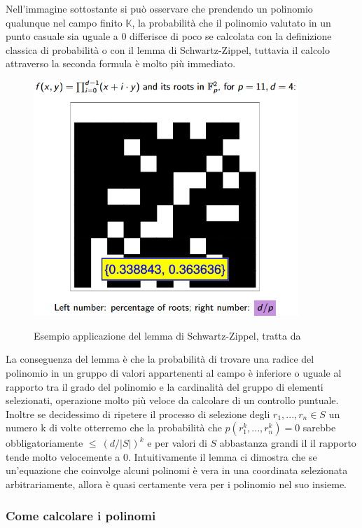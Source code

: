 Nell'immagine sottostante si può osservare che prendendo un polinomio qualunque nel campo finito $\mathbb{K}$, la
probabilità che il polinomio valutato in un punto casuale sia uguale a 0 differisce di poco se calcolata con la
definizione classica di probabilità o con il lemma di Schwartz-Zippel, tuttavia il calcolo attraverso la seconda formula è molto più immediato.
\begin{figure}[H]
    \centering
    \includegraphics[width=10cm]{./chapters/1.state-of-art/images/7.schwartz_zippel_lemma.png}
    \label{fig:schwartz-zippel-lemma}
    \captionsetup{justification=centering}
    \caption{Esempio applicazione del lemma di Schwartz-Zippel, tratta da \cite{23-schwartz-zippel}}
\end{figure}
\clearpage

La conseguenza del lemma è che la probabilità di trovare una radice del polinomio in un gruppo di valori appartenenti al
campo è inferiore o uguale al rapporto tra il grado del polinomio e la cardinalità del gruppo di elementi selezionati,
operazione molto più veloce da calcolare di un controllo puntuale. Inoltre se decidessimo di ripetere il processo di
selezione degli $r_1,...,r_n \in S$ un numero k di volte otterremo che la probabilità che $p(r^k_1,...,r^k_n) = 0$
sarebbe obbligatoriamente $\le \ (d/|S|)^k$  e per valori di $S$ abbastanza grandi il il rapporto tende molto velocemente
a 0. Intuitivamente il lemma ci dimostra che se un'equazione che coinvolge alcuni polinomi è vera in una coordinata
selezionata arbitrariamente, allora è quasi certamente vera per i polinomio nel suo insieme.

\subsubsection{Come calcolare i polinomi}

